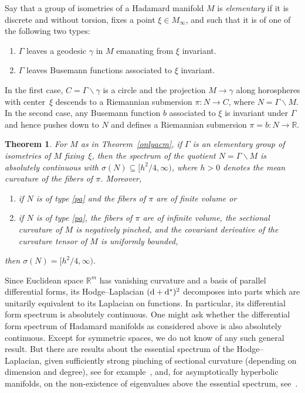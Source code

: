 \documentclass[10pt,a4paper]{amsart}
\numberwithin{equation}{section}
\newtheorem{Theorem}{Theorem}[section]
\def\R{\mathbb R}
\begin{document}
Say that a group of isometries of a Hadamard manifold $M$ is \emph{elementary}
if it is discrete and without torsion, fixes a point $\xi\in M_\infty$,
and such that it is of one of the following two types:
\begin{enumerate}[label=(\alph*)]\itemsep=0pt
\item\label{ax} $\Gamma$ leaves a geodesic $\gamma$ in $M$ emanating from $\xi$ invariant.
\item\label{pa} $\Gamma$ leaves Busemann functions associated to $\xi$ invariant.
\end{enumerate}
In the first case, $C=\Gamma\backslash\gamma$ is a circle and the projection $M\to\gamma$
along horospheres with center~$\xi$ descends to a Riemannian submersion $\pi\colon N\to C$,
where $N=\Gamma\backslash M$.
In the second case,
any Busemann function $b$ associated to $\xi$ is invariant under $\Gamma$
and hence pushes down to $N$ and defines a Riemannian submersion $\pi=b\colon N\to\R$.

\begin{Theorem}\label{onlyacn}
For $M$ as in Theorem~{\rm \ref{onlyacm}}, if $\Gamma$ is an elementary group of isometries of $M$ fixing~$\xi$,
then the spectrum of the quotient $N=\Gamma\backslash M$ is absolutely continuous
with $\sigma(N)\subseteq\bigl[h^2/4,\infty\bigr)$, where $h>0$ denotes the mean curvature of the fibers of $\pi$.
Moreover,
\begin{enumerate}[label={\rm (\arabic*)}]\itemsep=0pt
\item
if $N$ is of type {\rm \ref{pa}} and the fibers of $\pi$ are of finite volume or
\item
if $N$ is of type {\rm \ref{pa}}, the fibers of $\pi$ are of infinite volume,
the sectional curvature of $M$ is negatively pinched,
and the covariant derivative of the curvature tensor of $M$ is uniformly bounded,
\end{enumerate}
then $\sigma(N)=\bigl[h^2/4,\infty\bigr)$.
\end{Theorem}

Since Euclidean space $\R^m$ has vanishing curvature and a basis of parallel differential forms,
its Hodge--Laplacian $({\rm d}+{\rm d}^*)^2$ decomposes into parts which are unitarily equivalent to its Laplacian on functions.
In particular, its differential form spectrum is absolutely continuous.
One might ask whether the differential form spectrum of Hadamard manifolds as considered above
is also absolutely continuous.
Except for symmetric spaces,
we do not know of any such general result.
But there are results about the essential spectrum of the Hodge--Laplacian,
given sufficiently strong pinching of sectional curvature (depending on dimension and degree),
see for ex\-am\-ple~\cite{DX84,Kas94},
and, for asymptotically hyperbolic manifolds, on the non-existence of eigenvalues
above the essential spectrum, see~\cite[Theorem 16]{Ma91}.
\end{document}
